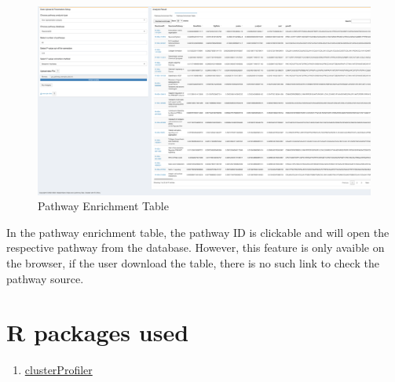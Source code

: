 \documentclass[
  a4paper,
  oneside,
  open=any]{scrreport}
\providecommand{\tightlist}{%
  \setlength{\itemsep}{0pt}\setlength{\parskip}{0pt}}\usepackage{longtable,booktabs,array}
\begin{document}
\begin{figure}[H]

{\centering \includegraphics{./_images/PathEnrichTable1.png}

}

\caption{Pathway Enrichment Table}

\end{figure}

\begin{tcolorbox}[enhanced jigsaw, left=2mm, colback=white, breakable, leftrule=.75mm, coltitle=black, toprule=.15mm, rightrule=.15mm, colbacktitle=quarto-callout-warning-color!10!white, title=\textcolor{quarto-callout-warning-color}{\faExclamationTriangle}\hspace{0.5em}{Warning}, opacitybacktitle=0.6, colframe=quarto-callout-warning-color-frame, bottomrule=.15mm, bottomtitle=1mm, toptitle=1mm, titlerule=0mm, opacityback=0, arc=.35mm]
In the pathway enrichment table, the pathway ID is clickable and will
open the respective pathway from the database. However, this feature is
only avaible on the browser, if the user download the table, there is no
such link to check the pathway source.
\end{tcolorbox}

\hypertarget{r-packages-used-5}{%
\section{R packages used}\label{r-packages-used-5}}

\begin{enumerate}
\def\labelenumi{\arabic{enumi}.}
\tightlist
\item
  \href{https://bioconductor.org/packages/release/bioc/vignettes/clusterProfiler/inst/doc/clusterProfiler.html}{clusterProfiler}
\end{enumerate}
\end{document}
